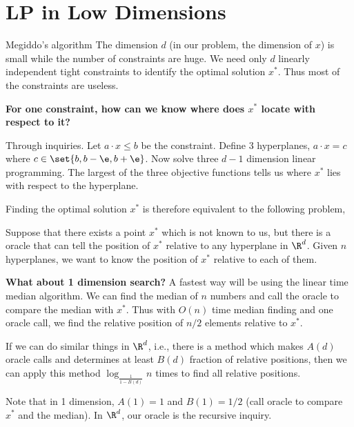 \documentclass{beamer}
\begin{document}
\section{LP in Low Dimensions}
\begin{frame}[allowframebreaks]{Megiddo's algorithm}%
    The dimension $d$ (in our problem, the dimension of $x$) is small while the number of constraints are huge. We need only $d$ linearly independent tight constraints to identify the optimal solution $x^*$.
    Thus most of the constraints are useless.



    \textbf{For one constraint, how can we know where does $x^*$ locate with respect to it?}

    Through inquiries. Let $a\cdot x \leq b$ be the constraint. Define 3 hyperplanes, $a\cdot x = c$ where $c\in \set{b,b-\e,b+\e}$. Now solve three $d-1$ dimension linear programming. The largest of the three objective functions tells us where $x^*$ lies with respect to the
    hyperplane.

    \newpage
    Finding the optimal solution $x^*$ is therefore equivalent to the following problem,
    \begin{problem}
        Suppose that there exists a point $x^*$ which is not known to us, but there is a oracle that can tell the position of $x^*$ relative to any hyperplane in $\R^d$. Given $n$ hyperplanes, we want to know the position of $x^*$ relative to each of them.
    \end{problem}

    \textbf{What about 1 dimension search?} A fastest way will be using the linear time median algorithm. We can find the median of $n$ numbers and call the oracle to compare the median with $x^*$. Thus with $O(n)$ time median finding and one oracle call, we find the relative position of $n/2$ elements relative to $x^*$.

    \newpage

    If we can do similar things in $\R^d$, i.e., there is a method which makes $A(d)$ oracle calls and determines at least $B(d)$ fraction of relative positions, then we can apply this method $\log_{\frac{1}{1-B(d)}} n$ times to find all relative positions.

    Note that in 1 dimension, $A(1)=1$ and $B(1)=1/2$ (call oracle to compare $x^*$ and the median). In $\R^d$, our oracle is the recursive inquiry.


\end{frame}
\end{document}
